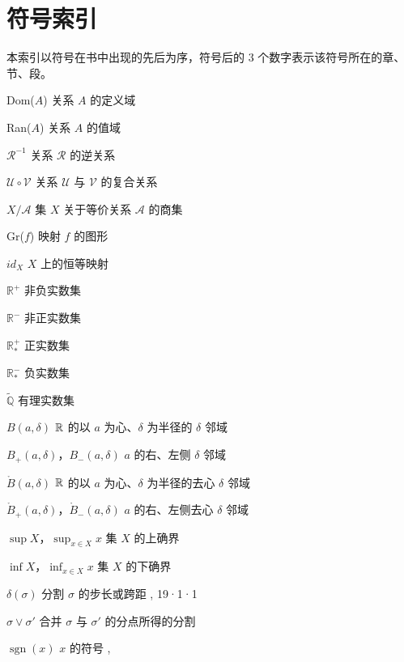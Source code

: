 \chapter{符号索引}

本索引以符号在书中出现的先后为序，符号后的 3 个数字表示该符号所在的章、节、段。

Dom(\(A\)) 关系 \(A\) 的定义域 

Ran(\(A\)) 关系 \(A\) 的值域 

\(\mathscr{R}^{-1}\) 关系 \(\mathscr{R}\) 的逆关系 

\(\mathscr{U}\circ\mathscr{V}\) 关系 \(\mathscr{U}\) 与 \(\mathscr{V}\) 的复合关系 

\(X/\mathscr{A}\) 集 \(X\) 关于等价关系 \(\mathscr{A}\) 的商集 

Gr(\(f\)) 映射 \(f\) 的图形 

\(id_X\) \(X\) 上的恒等映射 

\(\mathbb{R}^{+}\) 非负实数集 

\(\mathbb{R}^{-}\) 非正实数集 

\(\mathbb{R}^{+}_{*}\) 正实数集 

\(\mathbb{R}^{-}_{*}\) 负实数集 

\(\widetilde{\mathbb{Q}}\) 有理实数集 

\(B(a,\delta)\) \(\mathbb{R}\) 的以 \(a\) 为心、\(\delta\) 为半径的 \(\delta\) 邻域 

\(B_+(a,\delta)\)，\(B_-(a,\delta)\) \(a\) 的右、左侧 \(\delta\) 邻域 

\(\mathring{B}(a,\delta)\) \(\mathbb{R}\) 的以 \(a\) 为心、\(\delta\) 为半径的去心 \(\delta\) 邻域 

\(\mathring{B}_+(a,\delta)\)，\(\mathring{B}_-(a,\delta)\) \(a\) 的右、左侧去心 \(\delta\) 邻域 

\(\sup X\)，\(\sup_{x\in X}x\) 集 \(X\) 的上确界 

\(\inf X\)，\(\inf_{x\in X}x\) 集 \(X\) 的下确界 

\(\delta(\sigma)\) 分割 \(\sigma\) 的步长或跨距 , 19·1·1

\(\sigma\vee\sigma'\) 合并 \(\sigma\) 与 \(\sigma'\) 的分点所得的分割 

\(\operatorname{sgn}(x)\) \(x\) 的符号 , 

